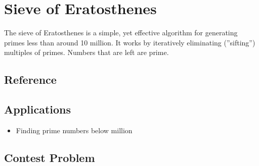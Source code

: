 \section{Sieve of Eratosthenes}
The sieve of Eratosthenes is a simple, yet effective algorithm for generating primes less than around 10 million.
It works by iteratively eliminating (''sifting'') multiples of primes.
Numbers that are left are prime.

\subsection{Reference}


\subsection{Applications}
\begin{itemize}
	\item	Finding prime numbers below  million
\end{itemize}

\subsection{Contest Problem}
